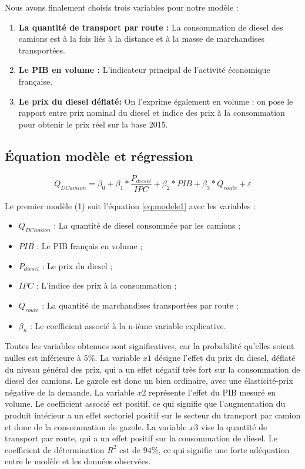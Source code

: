 \documentclass[
]{article}
\begin{document}
Nous avons finalement choisis trois variables pour notre modèle :

\begin{enumerate}
    \item \textbf{La quantité de transport par route :} La consommation de diesel des camions est à la fois liés à la distance et à la masse de marchandises transportées.
    \item \textbf{Le PIB en volume :} L'indicateur principal de l'activité économique française.
    \item \textbf{Le prix du diesel déflaté:} On l'exprime également en volume : on pose le rapport entre prix nominal du diesel et indice des prix à la consommation pour obtenir le prix réel sur la base 2015.
\end{enumerate}

\hypertarget{uxe9quation-moduxe8le-et-ruxe9gression}{%
\subsection{Équation modèle et
régression}\label{uxe9quation-moduxe8le-et-ruxe9gression}}

\begin{equation}
    \label{eq:modele1}
    Q_{DCamion} = \beta_0 + \beta_1*\frac{P_{diesel}}{IPC} +  \beta_2*PIB + \beta_3*Q_{route} + \varepsilon
\end{equation}

Le premier modèle (1) suit l'équation \ref{eq:modele1} avec les
variables :

\begin{itemize}
\item
  \(Q_{DCamion}\) : La quantité de diesel consommée par les camions ;
\item
  \(PIB\) : Le PIB français en volume ;
\item
  \(P_{diesel}\) : Le prix du diesel ;
\item
  \(IPC\) : L'indice des prix à la consommation ;
\item
  \(Q_{route}\) : La quantité de marchandises transportées par route ;
\item
  \(\beta_n\) : Le coefficient associé à la n-ième variable explicative.
\end{itemize}

Toutes les variables obtenues sont significatives, car la probabilité
qu'elles soient nulles est inférieure à 5\%. La variable \(x1\) désigne
l'effet du prix du diesel, déflaté du niveau général des prix, qui a un
effet négatif très fort sur la consommation de diesel des camions. Le
gazole est donc un bien ordinaire, avec une élasticité-prix négative de
la demande. La variable \(x2\) représente l'effet du PIB mesuré en
volume. Le coefficient associé est positif, ce qui signifie que
l'augmentation du produit intérieur a un effet sectoriel positif sur le
secteur du transport par camion et donc de la consommation de gazole. La
variable \(x3\) vise la quantité de transport par route, qui a un effet
positif sur la consommation de diesel. Le coefficient de détermination
\(R^2\) est de \(94\%\), ce qui signifie une forte adéquation entre le
modèle et les données observées.
\end{document}

